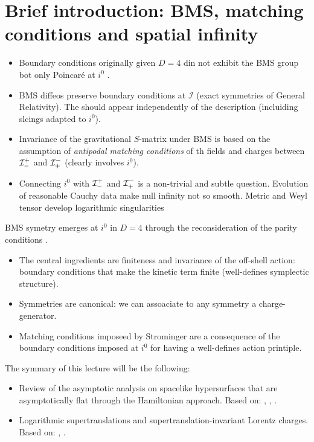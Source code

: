 \section{Brief introduction: BMS, matching conditions and spatial infinity}
\begin{itemize}
	\item Boundary conditions originally given $D=4$ din not exhibit the BMS group bot only Poincaré at $i^0$ \cite{Regge:1974zd}.
	\item BMS diffeos preserve boundary conditions at $\mathcal{I}$ (exact symmetries of General Relativity). The should appear independently of the description (incluiding slcings adapted to $i^0$).
	\item Invariance of the gravitational $S$-matrix under BMS is based on the assumption of \textit{antipodal matching conditions} of th fields and charges between $\mathcal{I}_-^+$ and $\mathcal{I}_+^-$ (clearly involves $i^0$).
	\item Connecting $i^0$ with $\mathcal{I}_-^+$ and $\mathcal{I}_+^-$ is a non-trivial and subtle question. Evolution of reasonable Cauchy data make null infinity not so smooth. Metric and Weyl tensor develop logarithmic singularities
\end{itemize} 

BMS symetry emerges at $i^0$ in $D=4$ through the reconsideration of the parity conditions \cite{Henneaux:2018cst}. 
\begin{itemize}
	\item The central ingredients are finiteness and invariance of the off-shell action: boundary conditions that make the kinetic term finite (well-defines symplectic structure).
	\item  Symmetries are canonical: we can assoaciate to any symmetry a charge-generator.
	\item Matching conditions imposeed by Strominger are a consequence of the boundary conditions imposed at $i^0$ for having a well-defines action printiple.
\end{itemize}

The symmary of this lecture will be the following:
\begin{itemize}
	\item Review of the asymptotic analysis on spacelike hypersurfaces that are asymptotically flat through the Hamiltonian approach. Based on: \cite{Regge:1974zd}, \cite{Henneaux:2018cst}, \cite{Henneaux:2019yax}.
	\item Logarithmic supertranslations and supertranslation-invariant Lorentz charges. Based on: \cite{Fuentealba:2022xsz}, \cite{Fuentealba:2023syb}.
\end{itemize}


